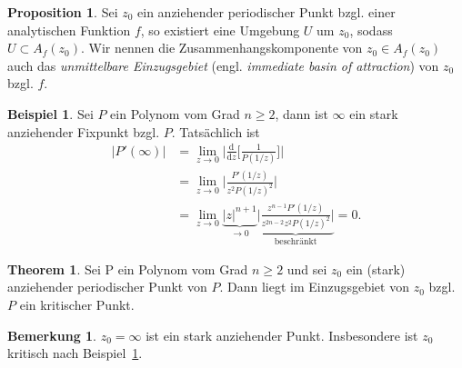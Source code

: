 \documentclass{beamer}
\theoremstyle{definition}
\newcounter{foo}
\newtheorem{thm}[foo]{Theorem}
\newtheorem{ex}[foo]{Beispiel}
\newtheorem*{bem*}{Bemerkung}
\newtheorem{prop}[foo]{Proposition}
\begin{document}
\begin{frame}
\begin{prop} \label{13}
Sei $z_0$ ein anziehender periodischer Punkt bzgl. einer analytischen Funktion $f$, so existiert eine Umgebung $U$ um $z_0$, sodass $U\subset A_f(z_0)$. Wir nennen die Zusammenhangskomponente von $z_0\in A_f(z_0)$ auch das \emph{unmittelbare Einzugsgebiet} (engl. \emph{immediate basin of attraction}) von $z_0$ bzgl. $f$.
\end{prop}
\end{frame}

\begin{frame}
\begin{ex} \label{14}
Sei $P$ ein Polynom vom Grad $n\ge 2$, dann ist $\infty$ ein stark anziehender Fixpunkt bzgl. $P$. Tatsächlich ist 
\begin{align*}
|P'(\infty)|&=\lim_{z\to 0}\Bigg|\frac{\mathrm{d}}{\mathrm{d}z}\Bigg[\frac{1}{P(1/z)}\Bigg]\Bigg|\\ &=\lim_{z\to 0}\Bigg|\frac{P'(1/z)}{z^2 P(1/z)^2}\Bigg|\\ &=\lim_{z\to 0} \underbrace{|z|^{n+1}}_{\to 0} \underbrace{\Bigg|\frac{z^{n-1} P'(1/z)}{z^{2n-2}z^2 P(1/z)^2}\Bigg|}_{\text{beschränkt}}=0.
\end{align*}
\end{ex}
\end{frame}

\begin{frame}
\begin{thm} \label{last}
Sei P ein Polynom vom Grad $n\ge 2$ und sei $z_0$ ein (stark) anziehender periodischer Punkt von $P$. Dann liegt im Einzugsgebiet von $z_0$ bzgl. $P$ ein kritischer Punkt.
\end{thm}

\begin{bem*}
$z_0=\infty$ ist ein stark anziehender Punkt. Insbesondere ist $z_0$ kritisch nach Beispiel~\ref{14}.
\end{bem*}
\end{frame}
\end{document}

